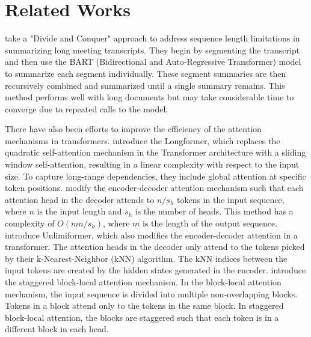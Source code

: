 \section{Related Works}
\label{sec:related-works}

\citet{golia2024action} take a "Divide and Conquer" approach to address sequence length limitations in summarizing long meeting transcripts.
They begin by segmenting the transcript and then use the BART (Bidirectional and Auto-Regressive Transformer) \cite{lewis-etal-2020-bart} model to summarize each segment individually.
These segment summaries are then recursively combined and summarized until a single summary remains.
This method performs well with long documents but may take considerable time to converge due to repeated calls to the model.

There have also been efforts to improve the efficiency of the attention mechanisms in transformers.
\citet{beltagy2020longformer} introduce the Longformer, which replaces the quadratic self-attention mechanism in the Transformer architecture with a sliding window self-attention, resulting in a linear complexity with respect to the input size.
To capture long-range dependencies, they include global attention at specific token positions.
\citet{huang-etal-2021-efficient} modify the encoder-decoder attention mechanism such that each attention head in the decoder attends to $n/s_h$ tokens in the input sequence, where $n$ is the input length and $s_h$ is the number of heads.
This method has a complexity of $O(mn/s_h)$, where $m$ is the length of the output sequence.
\citet{bertsch2023unlimiformer} introduce Unlimiformer, which also modifies the encoder-decoder attention in a transformer.
The attention heads in the decoder only attend to the tokens picked by their k-Nearest-Neighbor (kNN) algorithm.
The kNN indices between the input tokens are created by the hidden states generated in the encoder.
\citet{phang2022investigating} introduce the staggered block-local attention mechanism.
In the block-local attention mechanism, the input sequence is divided into multiple non-overlapping blocks.
Tokens in a block attend only to the tokens in the same block.
In staggered block-local attention, the blocks are staggered such that each token is in a different block in each head.


